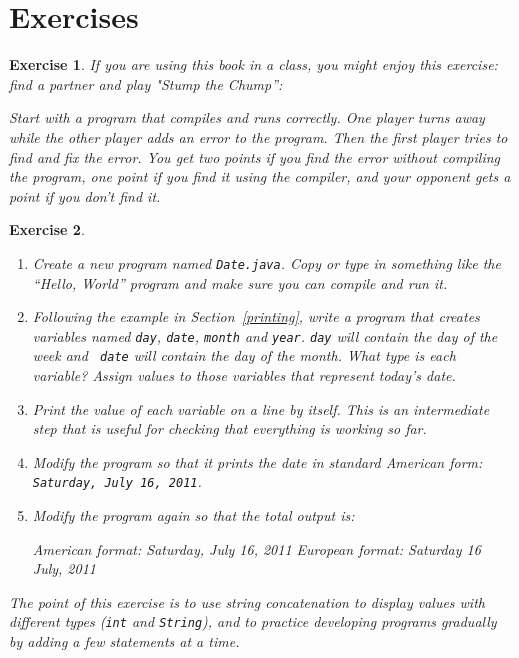 \documentclass[12pt]{book}
\theoremstyle{exercise}
\newtheorem{exercise}{Exercise}[chapter]
\begin{document}
\section{Exercises}

\begin{exercise}

If you are using this book in a class, you might enjoy this exercise:
find a partner and play "Stump the Chump'':

Start with a program that compiles and runs correctly.  One player
turns away while the other player adds an error to the program.  Then
the first player tries to find and fix the error.  You get two points
if you find the error without compiling the program, one point if you
find it using the compiler, and your opponent gets a point if you
don't find it.

\end{exercise}


\begin{exercise}
\label{ex.date}

\begin{enumerate}

\item Create a new program named {\tt Date.java}.  Copy or
type in something like the ``Hello, World'' program and make
sure you can compile and run it.

\item Following the example in Section~\ref{printing}, write a program
that creates variables named {\tt day}, {\tt date}, {\tt month}
and {\tt year}.  {\tt day} will contain the day of the week and {\tt
date} will contain the day of the month.  What type is each variable?
Assign values to those variables that represent today's date.

\item Print the value of each variable on a line by itself.  This is
an intermediate step that is useful for checking that everything is
working so far.

\item Modify the program so that it prints the date in standard
American form: {\tt Saturday, July 16, 2011}.

\item Modify the program again so that the total output is:

\begin{verbatimtab}
American format:
Saturday, July 16, 2011
European format:
Saturday 16 July, 2011
\end{verbatimtab}

\end{enumerate}

The point of this exercise is to use string concatenation to display
values with different types ({\tt int} and {\tt String}), and to
practice developing programs gradually by adding a few statements
at a time.

\end{exercise}
\end{document}
